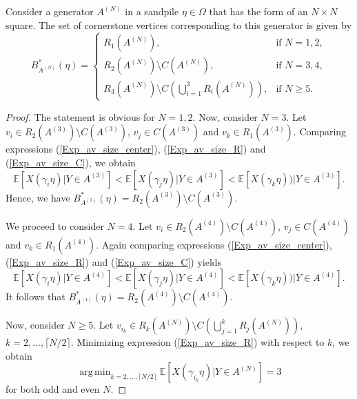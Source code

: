 \documentclass{article}
\DeclareMathOperator*{\argmin}{arg\,min}
\begin{document}
\begin{theorem}\label{thm_cornerstones_square_GOA}
Consider a generator $A^{(N)}$ in a sandpile $\eta\in \Omega$ that has the form of an $N \times N$ square. The set of cornerstone vertices corresponding to this generator is given by
\begin{equation*}
    B^*_{A^{(N)}}(\eta) = \begin{cases}
        R_1(A^{(N)}), &\text{if } N = 1, 2, \\
        R_2(A^{(N)}) \setminus C(A^{(N)}), &\text{if } N = 3, 4, \\
        R_3(A^{(N)}) \setminus C(\bigcup_{i=1}^3 R_i(A^{(N)})), &\text{if } N \geq 5.
        \end{cases}
\end{equation*}
\end{theorem}
\begin{proof}
    The statement is obvious for $N = 1,2$. Now, consider $N = 3$. Let $v_i \in R_2(A^{(3)})\setminus C(A^{(3)})$, $v_j \in C(A^{(3)})$ and $v_k \in R_1(A^{(3)})$. Comparing expressions (\ref{Exp_av_size_center}), (\ref{Exp_av_size_R}) and (\ref{Exp_av_size_C}), we obtain
    \begin{equation*}
        \mathbb{E}[X(\gamma_i \eta)|Y \in A^{(3)}] < \mathbb{E}[X(\gamma_j \eta)|Y \in A^{(3)}] < \mathbb{E}[X(\gamma_k \eta))|Y \in A^{(3)}].
    \end{equation*}
    Hence, we have $B^*_{A^{(3)}}(\eta) = R_2(A^{(3)}) \setminus C(A^{(3)})$. 

    We proceed to consider $N = 4$. Let $v_i \in R_2(A^{(4)})\setminus C(A^{(4)})$, $v_j \in C(A^{(4)})$ and $v_k \in R_1(A^{(4)})$. Again comparing expressions (\ref{Exp_av_size_center}), (\ref{Exp_av_size_R}) and (\ref{Exp_av_size_C}) yields
    \begin{equation*}
         \mathbb{E}[X(\gamma_i \eta)|Y \in A^{(4)}] < \mathbb{E}[X(\gamma_j \eta)|Y \in A^{(4)}] < \mathbb{E}[X(\gamma_k \eta))|Y \in A^{(4)}].
    \end{equation*}
    It follows that $B^*_{A^{(4)}}(\eta) = R_2(A^{(4)}) \setminus C(A^{(4)})$. 

    Now, consider $N \geq 5$. Let $v_{i_k} \in R_k(A^{(N)}) \setminus C(\bigcup_{j=1}^k R_j(A^{(N)}))$, $k = 2, \ldots, \lceil N/2 \rceil$. Minimizing expression (\ref{Exp_av_size_R}) with respect to $k$, we obtain
    \begin{equation*}
        \argmin_{k = 2, \ldots, \lceil N/2 \rceil} \mathbb{E}[X(\gamma_{i_k} \eta)|Y \in A^{(N)}] = 3
    \end{equation*}
    for both odd and even $N$. 
    

\end{proof}
\end{document}
